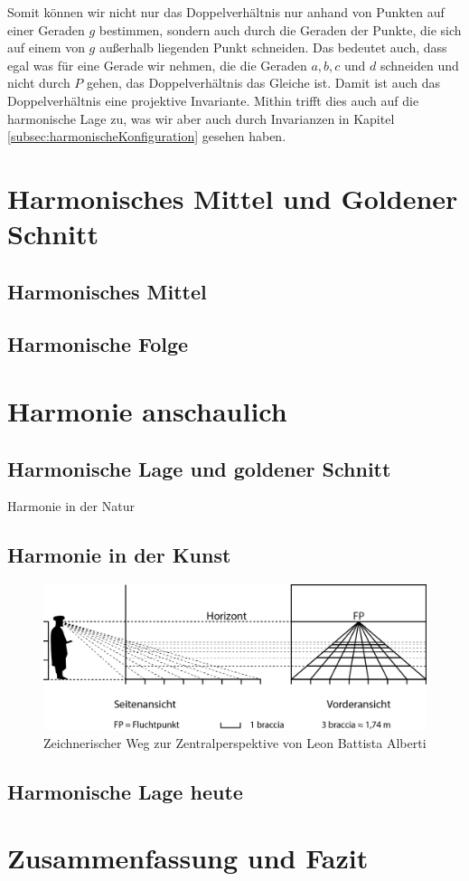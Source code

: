 \documentclass[12pt,a4paper]{article}
\begin{document}
Somit können wir nicht nur das Doppelverhältnis nur anhand von Punkten auf einer Geraden $g$ bestimmen, sondern auch durch die Geraden der Punkte, die sich auf einem von $g$ außerhalb liegenden Punkt schneiden. Das bedeutet auch, dass egal was für eine Gerade wir nehmen, die die Geraden $a, b, c$ und $d$ schneiden und nicht durch $P$ gehen, das Doppelverhältnis das Gleiche ist. Damit ist auch das Doppelverhältnis eine projektive Invariante. Mithin trifft dies auch auf die harmonische Lage zu, was wir aber auch durch Invarianzen in Kapitel \ref{subsec:harmonischeKonfiguration} gesehen haben.

\newpage
\section{Harmonisches Mittel und Goldener Schnitt}
\label{sec:harmMittel}
\subsection{Harmonisches Mittel}

\subsection{Harmonische Folge}

\newpage
\section{Harmonie anschaulich}

\subsection{Harmonische Lage und goldener Schnitt}
Harmonie in der Natur

\subsection{Harmonie in der Kunst}

\begin{figure}[htbp] 
\centering
\includegraphics[width=\textwidth]{Bilder/braccia.png}
\caption{Zeichnerischer Weg zur Zentralperspektive von Leon Battista Alberti}
\label{fig:braccia}
\end{figure}

\subsection{Harmonische Lage heute}

\newpage
\section{Zusammenfassung und Fazit}

\newpage
\listoffigures

\newpage
{}


\end{document}
